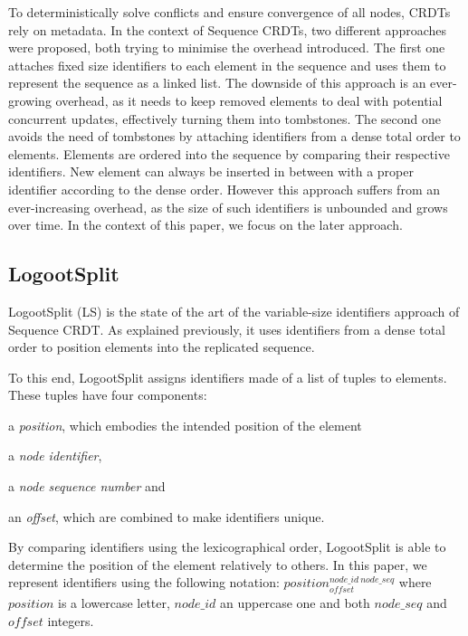 \documentclass[10pt,journal,compsoc]{IEEEtran}
\newcommand{\trm}[1]{\mathit{#1}}
\newcommand{\id}[3]{$\trm{#1}^{\trm{#2}}_{\trm{#3}}$}
\begin{document}
To deterministically solve conflicts and ensure convergence of all nodes, \acp{CRDT} rely on metadata.
In the context of Sequence \acp{CRDT}, two different approaches were proposed, both trying to minimise the overhead introduced.
The first one \cite{oster:inria-00108523, Weiss_2007, ahmednacer:inria-00629503, ROH2011354, briot:hal-01343941} attaches fixed size identifiers to each element in the sequence and uses them to represent the sequence as a linked list.
The downside of this approach is an ever-growing overhead, as it needs to keep removed elements to deal with potential concurrent updates, effectively turning them into tombstones.
The second one \cite{5158449,WeissICDCS09,weiss:hal-00450416,AndreCollaborateCom2013,lseq2013,lseq2017} avoids the need of tombstones by attaching identifiers from a dense total order to elements.
Elements are ordered into the sequence by comparing their respective identifiers.
New element can always be inserted in between with a proper identifier according to the dense order.
However this approach suffers from an ever-increasing overhead, as the size of such identifiers is unbounded and grows over time.
In the context of this paper, we focus on the later approach.


\subsection{LogootSplit}

LogootSplit (LS) \cite{AndreCollaborateCom2013} is the state of the art of the variable-size identifiers approach of Sequence \ac{CRDT}.
As explained previously, it uses identifiers from a dense total order to position elements into the replicated sequence.

To this end, LogootSplit assigns identifiers made of a list of tuples to elements.
These tuples have four components:
\begin{enumerate*}
    \item a \emph{position}, which embodies the intended position of the element
    \item a \emph{node identifier},
    \item a \emph{node sequence number} and
    \item an \emph{offset}, which are combined to make identifiers unique.
\end{enumerate*}
By comparing identifiers using the lexicographical order, LogootSplit is able to determine the position of the element relatively to others.
In this paper, we represent identifiers using the following notation: \id{position}{node\_id~node\_seq}{offset} where $\trm{position}$ is a lowercase letter, $\trm{node\_id}$ an uppercase one and both $\trm{node\_seq}$ and $\trm{offset}$ integers.
\end{document}

